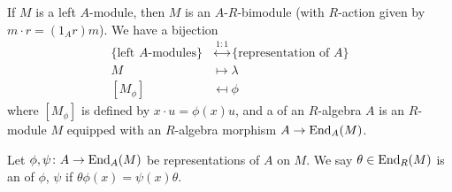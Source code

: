 \begin{node}
If $M$ is a left $A$-module, then $M$ is an $A$-$R$-bimodule (with
$R$-action given by $m\cdot r=(1_{A}r)m$). We have a bijection
\begin{equation}
\begin{split}
\{\mbox{left $A$-modules}\}&\stackrel{1:1}{\longleftrightarrow}\{\mbox{representation of $A$}\}\\
M&\mapsto\lambda\\
[M_{\phi}]&\mapsfrom\phi
\end{split}
\end{equation}
where $[M_{\phi}]$ is defined by $x\cdot u=\phi(x)u$, and a
 of an $R$-algebra $A$ is an $R$-module $M$
equipped with an $R$-algebra morphism $A\to\operatorname{End}_{A}(M)$.
\end{node}

\begin{definition}
Let $\phi,\psi\colon A\to\operatorname{End}_{A}(M)$ be representations of $A$ on
$M$. We say $\theta\in\operatorname{End}_{R}(M)$ is an  of
$\phi$, $\psi$ if $\theta\phi(x)=\psi(x)\theta$.
\end{definition}